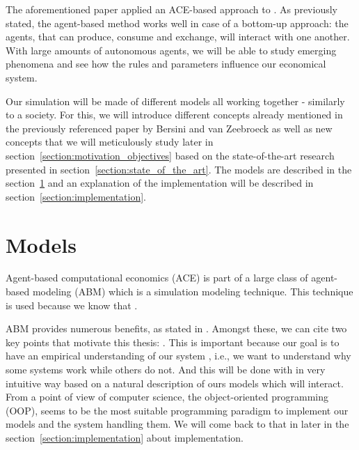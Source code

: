 \documentclass[20pt]{article}
\begin{document}
The aforementioned paper applied an ACE-based approach to . As previously stated, the agent-based method works well in case of a bottom-up approach: the agents, that can  produce, consume and exchange, will interact with one another. With large amounts of autonomous agents, we will be able to study emerging phenomena and see how the rules and parameters influence our economical system.

Our simulation will be made of different models all working together - similarly to a society. For this, we will introduce different concepts already mentioned in the previously referenced paper by Bersini and van Zeebroeck as well as new concepts that we will meticulously study later in section~\ref{section:motivation_objectives} based on the state-of-the-art research presented in section~\ref{section:state_of_the_art}. The models are described in the section~\ref{section:models} and an explanation of the implementation will be described in section~\ref{section:implementation}.

\section{Models}\label{section:models}

Agent-based computational economics (ACE) is part of a large class of agent-based modeling (ABM) which is a simulation modeling technique. This technique is used because we know that .\cite{ABM}

ABM provides numerous benefits, as stated in \cite{ABM}. Amongst these, we can cite two key points that motivate this thesis: . This is important because our goal is to have an empirical understanding of our system \cite{tesfatsion_handbook}, i.e., we want to understand why some systems work while others do not. And this will be done with in very intuitive way based on a natural description of ours models which will interact.
From a point of view of computer science, the object-oriented programming (OOP), seems to be the most suitable programming paradigm to implement our models and the system handling them. We will come back to that in later in the section~\ref{section:implementation} about implementation.
\end{document}
